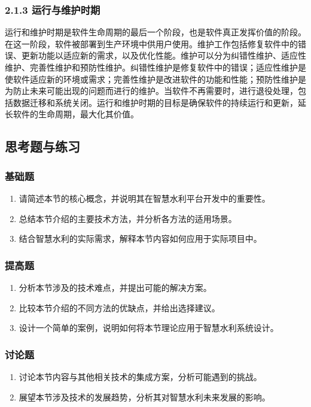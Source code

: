 \subsubsection{2.1.3 运行与维护时期}\label{ux8fd0ux884cux4e0eux7ef4ux62a4ux65f6ux671f}
运行和维护时期是软件生命周期的最后一个阶段，也是软件真正发挥价值的阶段。在这一阶段，软件被部署到生产环境中供用户使用。维护工作包括修复软件中的错误、更新功能以适应新的需求，以及优化性能。维护可以分为纠错性维护、适应性维护、完善性维护和预防性维护。纠错性维护是修复软件中的错误；适应性维护是使软件适应新的环境或需求；完善性维护是改进软件的功能和性能；预防性维护是为防止未来可能出现的问题而进行的维护。当软件不再需要时，进行退役处理，包括数据迁移和系统关闭。运行和维护时期的目标是确保软件的持续运行和更新，延长软件的生命周期，最大化其价值。
\subsection{思考题与练习}\label{ux601dux8003ux9898ux4e0eux7ec3ux4e60} \subsubsection{基础题}\label{ux57faux7840ux9898}
\begin{enumerate} \def\labelenumi{\arabic{enumi}.} \tightlist \item 请简述本节的核心概念，并说明其在智慧水利平台开发中的重要性。 \item
总结本节介绍的主要技术方法，并分析各方法的适用场景。 \item 结合智慧水利的实际需求，解释本节内容如何应用于实际项目中。 \end{enumerate}
\subsubsection{提高题}\label{ux63d0ux9ad8ux9898} \begin{enumerate} \def\labelenumi{\arabic{enumi}.} \tightlist \item
分析本节涉及的技术难点，并提出可能的解决方案。 \item 比较本节介绍的不同方法的优缺点，并给出选择建议。 \item 设计一个简单的案例，说明如何将本节理论应用于智慧水利系统设计。 \end{enumerate}
\subsubsection{讨论题}\label{ux8ba8ux8bbaux9898} \begin{enumerate} \def\labelenumi{\arabic{enumi}.} \tightlist \item
讨论本节内容与其他相关技术的集成方案，分析可能遇到的挑战。 \item 展望本节涉及技术的发展趋势，分析其对智慧水利未来发展的影响。 \end{enumerate}
